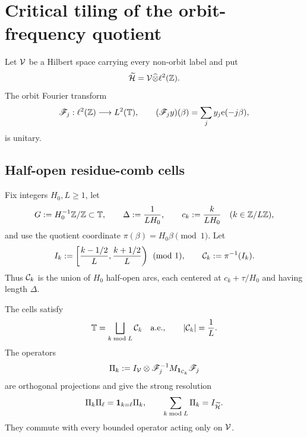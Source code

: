 \section{Critical tiling of the orbit-frequency quotient}
\label{sec:tpc48-tiling}

Let \(\mathcal V\) be a Hilbert space carrying every non-orbit label and put
\begin{equation}
 \widetilde{\mathcal H}=\mathcal V\widehat\otimes\ell^2(\mathbb Z).
 \label{eq:tpc48-abstract-orbit-space}
\end{equation}
The orbit Fourier transform
\begin{equation}
 \mathscr F_j:\ell^2(\mathbb Z)\longrightarrow L^2(\mathbb T),
 \qquad
 (\mathscr F_jy)(\beta)=\sum_jy_j\mathrm e(-j\beta),
 \label{eq:tpc48-orbit-Fourier}
\end{equation}
is unitary.

\subsection{Half-open residue-comb cells}

Fix integers \(H_0,L\ge1\), let
\begin{equation}
 G:=H_0^{-1}\mathbb Z/\mathbb Z\subset\mathbb T,
 \qquad
 \Delta:=\frac1{LH_0},
 \qquad
 c_k:=\frac{k}{LH_0}\quad(k\in\mathbb Z/L\mathbb Z),
 \label{eq:tpc48-quotient-scales}
\end{equation}
and use the quotient coordinate \(\pi(\beta)=H_0\beta\pmod1\).
Let
\begin{equation}
 I_k:=\left[\frac{k-1/2}{L},\frac{k+1/2}{L}\right)
 \pmod1,
 \qquad
 \mathcal C_k:=\pi^{-1}(I_k).
 \label{eq:tpc48-comb-cells}
\end{equation}
Thus \(\mathcal C_k\) is the union of \(H_0\) half-open arcs, each centered
at \(c_k+\tau/H_0\) and having length \(\Delta\).

\begin{proposition}
\label{prop:tpc48-comb-partition}
The cells satisfy
\begin{equation}
 \mathbb T=\bigsqcup_{k\bmod L}\mathcal C_k\quad\text{a.e.},
 \qquad
 |\mathcal C_k|=\frac1L.
 \label{eq:tpc48-comb-partition}
\end{equation}
The operators
\begin{equation}
 \Pi_k:=I_\mathcal V\otimes\mathscr F_j^{-1}
 M_{\mathbf 1_{\mathcal C_k}}\mathscr F_j
 \label{eq:tpc48-band-projectors}
\end{equation}
are orthogonal projections and give the strong resolution
\begin{equation}
 \Pi_k\Pi_\ell=\mathbf 1_{k=\ell}\Pi_k,
 \qquad
 \sum_{k\bmod L}\Pi_k=I_{\widetilde{\mathcal H}}.
 \label{eq:tpc48-projector-resolution}
\end{equation}
They commute with every bounded operator acting only on \(\mathcal V\).
\end{proposition}

